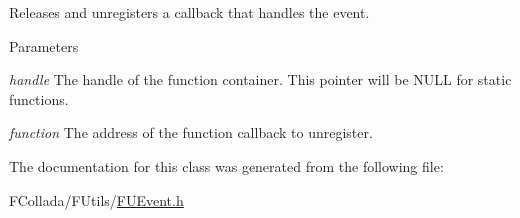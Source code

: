 \label{classFUEvent1_afb98dd5422f51541b03b744c0440f156}
Releases and unregisters a callback that handles the event. 
\begin{DoxyParams}{Parameters}
\item[{\em handle}]The handle of the function container. This pointer will be NULL for static functions. \item[{\em function}]The address of the function callback to unregister. \end{DoxyParams}


The documentation for this class was generated from the following file:\begin{DoxyCompactItemize}
\item 
FCollada/FUtils/\hyperlink{FUEvent_8h}{FUEvent.h}\end{DoxyCompactItemize}
